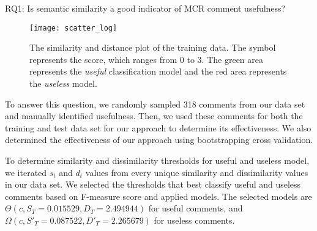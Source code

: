 \begin{ResearchQuestions}
\item[RQ1:] Is semantic similarity a good indicator of MCR comment usefulness?
\end{ResearchQuestions}

\begin{figure}[!t]
\centering
\texttt{[image: scatter\_log]}
\caption{The similarity and distance plot of the training data.
The symbol represents the score, which ranges from 0 to 3.
The green area represents the \emph{useful} classification model and the red area represents the \emph{useless} model.}
\label{fig:scatter}
\end{figure}

To answer this question, we randomly sampled 318 comments from our data set and manually identified usefulness.
Then, we used these comments for both the training and test data set for our approach to determine its effectiveness.
We also determined the effectiveness of our approach using bootstrapping cross validation.


%

To determine similarity and dissimilarity thresholds for useful and useless model, we iterated $s_t$ and $d_t$ values from every unique similarity and dissimilarity values in our data set.
We selected the thresholds that best classify useful and useless comments based on F-measure score and applied models.
The selected models are $\Theta(c,S_T=0.015529,D_T=2.494944)$ for useful comments, and $\Omega(c,S'_T=0.087522,D'_T=2.265679)$ for useless comments.




